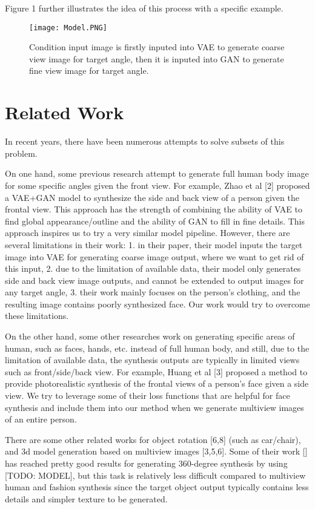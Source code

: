 \documentclass[10pt,conference]{IEEEtran}
\begin{document}
Figure 1 further illustrates the idea of this process with a specific example.

\begin{figure}[htbp]
\centering
\texttt{[image: Model.PNG]}
\caption{Condition input image is firstly inputed into VAE to generate coarse view image for target angle, then it is inputed into GAN to generate fine view image for target angle.}
\end{figure}


\section{Related Work}
In recent years, there have been numerous attempts to solve subsets of this problem. 

On one hand, some previous research attempt to generate full human body image for some specific angles given the front view. For example, Zhao et al [2] proposed a VAE+GAN model to synthesize the side and back view of a person given the frontal view. This approach has the strength of combining the ability of VAE to find global appearance/outline and the ability of GAN to fill in fine details. This approach inspires us to try a very similar model pipeline. However, there are several limitations in their work: 1. in their paper, their model inputs the target image into VAE for generating coarse image output, where we want to get rid of this input, 2. due to the limitation of available data, their model only generates side and back view image outputs, and cannot be extended to output images for any target angle, 3. their work mainly focuses on the person’s clothing, and the resulting image contains poorly synthesized face. Our work would try to overcome these limitations.

On the other hand, some other researches work on generating specific areas of human, such as faces, hands, etc. instead of full human body, and still, due to the limitation of available data, the synthesis outputs are typically in limited views such as front/side/back view. For example, Huang et al [3] proposed a method to provide photorealistic synthesis of the frontal views of a person’s face given a side view. We try to leverage some of their loss functions that are helpful for face synthesis and include them into our method when we generate multiview images of an entire person.

There are some other related works for object rotation [6,8] (such as car/chair), and 3d model generation based on multiview images [3,5,6]. Some of their work [] has reached pretty good results for generating 360-degree synthesis by using [TODO: MODEL], but this task is relatively less difficult compared to multiview human and fashion synthesis since the target object output typically contains less details and simpler texture to be generated. 
\end{document}
